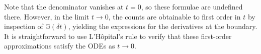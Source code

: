 \documentclass{article}
\begin{document}
Note that the denominator vanishes at $t=0$, so these formulae are undefined there.
However, in the limit $t \to 0$, the counts are obtainable to first order in $t$ by inspection of $\mathbb{G}(\delta t)$,
yielding the expressions for the derivatives at the boundary.
It is straightforward to use L'H\^{o}pital's rule to verify that these first-order approximations satisfy the ODEs as $t \to 0$.
%

\end{document}
